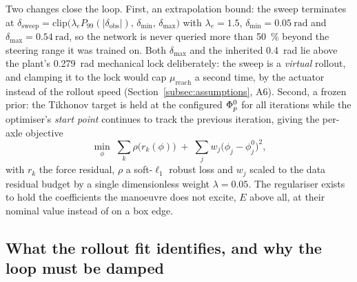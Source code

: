 Two changes close the loop. First, an extrapolation bound: the sweep
terminates at $\delta_{\mathrm{sweep}}=\mathrm{clip}\big(\lambda_{e}
P_{99}(|\delta_{\mathrm{obs}}|),\,\delta_{\min},\,\delta_{\max}\big)$ with
$\lambda_{e}=1.5$, $\delta_{\min}=\SI{0.05}{\radian}$ and
$\delta_{\max}=\SI{0.54}{\radian}$, so the network is never queried more than
\SI{50}{\percent} beyond the steering range it was trained on. Both
$\delta_{\max}$ and the inherited \SI{0.4}{\radian} lie above the plant's
\SI{0.279}{\radian} mechanical lock deliberately: the sweep is a \emph{virtual}
rollout, and clamping it to the lock would cap $\mu_{\mathrm{reach}}$ a second
time, by the actuator instead of the rollout speed
(Section~\ref{subsec:assumptions}, A6). Second, a frozen prior: the
Tikhonov target is held at the configured $\Phi_{p}^{0}$ for all iterations while
the optimiser's \emph{start point} continues to track the previous iteration,
giving the per-axle objective
\begin{equation}
\min_{\phi}\;\sum_{k}\rho\!\big(r_{k}(\phi)\big)\;+\;\sum_{j}w_{j}\big(\phi_{j}-\phi^{0}_{j}\big)^{2},
\label{eq:fitobj}
\end{equation}
with $r_{k}$ the force residual, $\rho$ a soft-$\ell_{1}$ robust loss and
$w_{j}$ scaled to the data residual budget by a single dimensionless weight
$\lambda=0.05$. The regulariser exists to hold the coefficients the manoeuvre
does not excite, $E$ above all, at their nominal value instead of on a box edge.

\subsection{What the rollout fit identifies, and why the loop must be damped}
\label{subsec:contraction}

